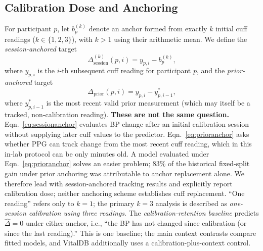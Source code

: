 \documentclass[12pt]{article}
\begin{document}
\subsection{Calibration Dose and Anchoring}
\label{sec:anchoring}
For participant $p$, let $b_p^{(k)}$ denote an anchor formed from exactly $k$ initial cuff readings ($k\in\{1,2,3\}$), with $k>1$ using their arithmetic mean. We define the \emph{session-anchored} target
\begin{equation}
\Delta_{\mathrm{session}}^{(k)}(p,i) = y_{p,i} - b_p^{(k)},
\label{eq:sessionanchor}
\end{equation}
where $y_{p,i}$ is the $i$-th subsequent cuff reading for participant $p$, and the \emph{prior-anchored} target
\begin{equation}
\Delta_{\mathrm{prior}}(p,i) = y_{p,i} - y_{p,i-1}^{*},
\label{eq:prioranchor}
\end{equation}
where $y_{p,i-1}^{*}$ is the most recent valid prior measurement (which may itself be a tracked, non-calibration reading). \textbf{These are not the same question.} Eqn.~\ref{eq:sessionanchor} evaluates BP change after an initial calibration session without supplying later cuff values to the predictor. Eqn.~\ref{eq:prioranchor} asks whether PPG can track change from the most recent cuff reading, which in this in-lab protocol can be only minutes old. A model evaluated under Eqn.~\ref{eq:prioranchor} solves an easier problem; $83\%$ of the historical fixed-split gain under prior anchoring was attributable to anchor replacement alone. We therefore lead with session-anchored tracking results and explicitly report calibration dose; neither anchoring scheme establishes cuff replacement. ``One reading'' refers only to $k=1$; the primary $k=3$ analysis is described as \emph{one-session calibration using three readings}.
The \emph{calibration-retention baseline} predicts $\hat{\Delta} = 0$ under either anchor, i.e., ``the BP has not changed since calibration (or since the last reading).'' This is one baseline; the main context contrasts compare fitted models, and VitalDB additionally uses a calibration-plus-context control.
\end{document}

